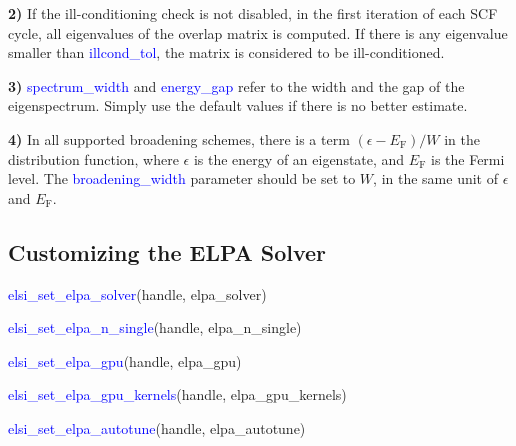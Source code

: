 \documentclass{report}
\begin{document}
\textbf{2)} If the ill-conditioning check is not disabled, in the first iteration of each SCF cycle, all eigenvalues of the overlap matrix is computed.  If there is any eigenvalue smaller than \textcolor{blue}{illcond\_tol}, the matrix is considered to be ill-conditioned.

\textbf{3)} \textcolor{blue}{spectrum\_width} and \textcolor{blue}{energy\_gap} refer to the width and the gap of the eigenspectrum.  Simply use the default values if there is no better estimate.

\textbf{4)} In all supported broadening schemes, there is a term $(\epsilon - E_\text{F})/W$ in the distribution function, where $\epsilon$ is the energy of an eigenstate, and $E_\text{F}$ is the Fermi level.  The \textcolor{blue}{broadening\_width} parameter should be set to $W$, in the same unit of $\epsilon$ and $E_\text{F}$.

\subsection{Customizing the ELPA Solver}
\label{subsec:setter_elpa}
\begin{labeling}{\hspace{6cm}}
\item [\hspace{0.3cm} \textcolor{blue}{elsi\_set\_elpa\_solver}(handle, elpa\_solver)]
\item [\hspace{0.3cm} \textcolor{blue}{elsi\_set\_elpa\_n\_single}(handle, elpa\_n\_single)]
\item [\hspace{0.3cm} \textcolor{blue}{elsi\_set\_elpa\_gpu}(handle, elpa\_gpu)]
\item [\hspace{0.3cm} \textcolor{blue}{elsi\_set\_elpa\_gpu\_kernels}(handle, elpa\_gpu\_kernels)]
\item [\hspace{0.3cm} \textcolor{blue}{elsi\_set\_elpa\_autotune}(handle, elpa\_autotune)]
\end{labeling}
\end{document}
